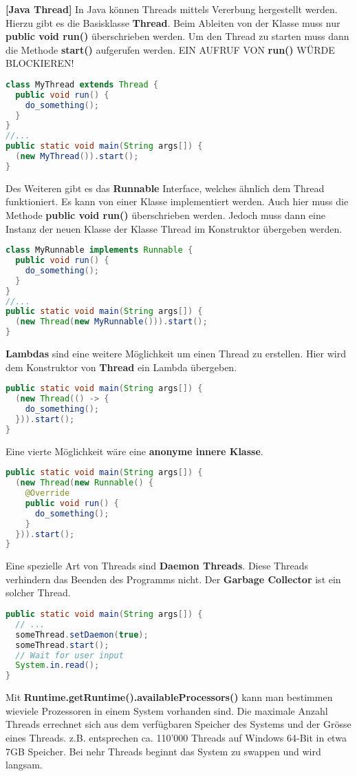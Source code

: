 \documentclass[8pt]{extarticle}
\let\oldtextbf\textbf
\renewcommand{\textbf}{\tiny\oldtextbf}
\begin{document}
\begin{multicols*}{5}
\textbf{[Java Thread]}
In Java können Threads mittels Vererbung hergestellt werden. Hierzu gibt es die Basisklasse \textbf{Thread}. Beim Ableiten von der Klasse muss nur \textbf{public void run()} überschrieben werden. Um den Thread zu starten muss dann die Methode \textbf{start()} aufgerufen werden. EIN AUFRUF VON \textbf{run()} WÜRDE BLOCKIEREN!
\begin{lstlisting}[language=java]
class MyThread extends Thread {
  public void run() {
    do_something();
  }
}
//...
public static void main(String args[]) {
  (new MyThread()).start();
}
\end{lstlisting}
Des Weiteren gibt es das \textbf{Runnable} Interface, welches ähnlich dem Thread funktioniert. Es kann von einer Klasse implementiert werden. Auch hier muss die Methode \textbf{public void run()} überschrieben werden. Jedoch muss dann eine Instanz der neuen Klasse der Klasse Thread im Konstruktor übergeben werden.
\begin{lstlisting}[language=java]
class MyRunnable implements Runnable {
  public void run() {
    do_something();
  }
}
//...
public static void main(String args[]) {
  (new Thread(new MyRunnable())).start();
}
\end{lstlisting}
\textbf{Lambdas} sind eine weitere Möglichkeit um einen Thread zu erstellen. Hier wird dem Konstruktor von \textbf{Thread} ein Lambda übergeben.
\begin{lstlisting}[language=java]
public static void main(String args[]) {
  (new Thread(() -> {
    do_something();
  })).start();
}
\end{lstlisting}
Eine vierte Möglichkeit wäre eine \textbf{anonyme innere Klasse}.
\begin{lstlisting}[language=java]
public static void main(String args[]) {
  (new Thread(new Runnable() {
    @Override
    public void run() {
      do_something();
    }
  })).start();
}
\end{lstlisting}
Eine spezielle Art von Threads sind \textbf{Daemon Threads}. Diese Threads verhindern das Beenden des Programms nicht. Der \textbf{Garbage Collector} ist ein solcher Thread.
\begin{lstlisting}[language=java]
public static void main(String args[]) {
  // ...
  someThread.setDaemon(true);
  someThread.start();
  // Wait for user input
  System.in.read();
}
\end{lstlisting}
Mit \textbf{Runtime.getRuntime().availableProcessors()} kann man bestimmen wieviele Prozessoren in einem System vorhanden sind. Die maximale Anzahl Threads errechnet sich aus dem verfügbaren Speicher des Systems und der Grösse eines Threads. z.B. entsprechen ca. 110'000 Threads auf Windows 64-Bit in etwa 7GB Speicher. Bei nehr Threads beginnt das System zu swappen und wird langsam.\\\\

\end{multicols*}
\end{document}
